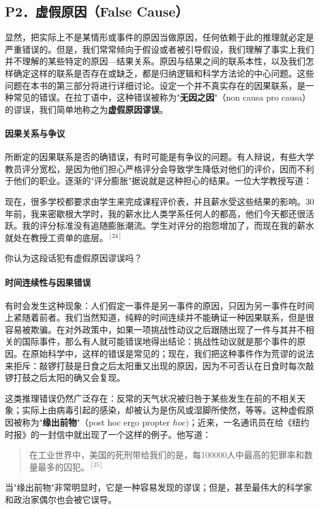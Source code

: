 \subsection{P2．虚假原因（False Cause）}

显然，把实际上不是某情形或事件的原因当做原因，任何依赖于此的推理就必定是严重错误的。但是，我们常常倾向于假设或者被引导假设，我们理解了事实上我们并不理解的某些特定的原因—结果关系。原因与结果之间的联系本性，以及我们怎样确定这样的联系是否存在或缺乏，都是归纳逻辑和科学方法论的中心问题。这些问题在本书的第三部分将进行详细讨论。设定一个并不真实存在的因果联系，是一种常见的错误。在拉丁语中，这种错误被称为"\textbf{无因之因}"（non causa pro causa）的谬误，我们简单地称之为\textbf{虚假原因谬误}。

\paragraph{因果关系与争议}
所断定的因果联系是否的确错误，有时可能是有争议的问题。有人辩说，有些大学教员评分宽松，是因为他们担心严格评分会导致学生降低对他们的评价，因而不利于他们的职业。逐渐的"评分膨胀"据说就是这种担心的结果。一位大学教授写道：

现在，很多学校都要求由学生来完成课程评价表，并且薪水受这些结果的影响。30年前，我来密歇根大学时，我的薪水比人类学系任何人的都高，他们今天都还很活跃。我的评分标准没有追随膨胀潮流。学生对评分的抱怨增加了，而现在我的薪水就处在教授工资单的底层。${ }^{[24]}$

你认为这段话犯有虚假原因谬误吗？\\

\paragraph{时间连续性与因果错误}
有时会发生这种现象：人们假定一事件是另一事件的原因，只因为另一事件在时间上紧随着前者。我们当然知道，纯粹的时间连续并不能确证一种因果联系，但是很容易被欺骗。在对外政策中，如果一项挑战性动议之后跟随出现了一件与其并不相关的国际事件，那么有人就可能错误地得出结论：挑战性动议就是那个事件的原因。在原始科学中，这样的错误是常见的；现在，我们把这种事件作为荒谬的说法来拒斥：敲锣打鼓是日食之后太阳重又出现的原因，因为不可否认在日食时每次敲锣打鼓之后太阳的确又会复现。

这类推理错误仍然广泛存在：反常的天气状况被归咎于某些发生在前的不相关天象；实际上由病毒引起的感染，却被认为是伤风或湿脚所使然，等等。这种虚假原因被称为"\textbf{缘出前物}"（post hoc ergo propter $h o c)$；近来，一名通讯员在给《纽约时报》的一封信中就出现了一个这样的例子。他写道：

\begin{quote}
在工业世界中，美国的死刑带给我们的是，每100000人中最高的犯罪率和数量最多的囚犯。${ }^{[25]}$
\end{quote}

当"缘出前物"非常明显时，它是一种容易发现的谬误；但是，甚至最伟大的科学家和政治家偶尔也会被它误导。 